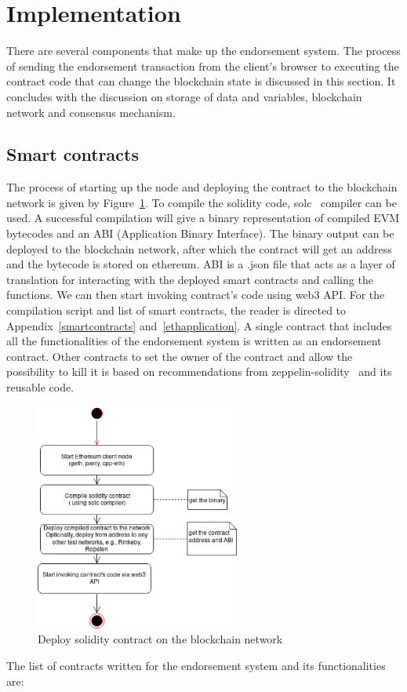 \section{Implementation}
There are several components that make up the endorsement system. The process
of sending the endorsement transaction from the client's browser to executing
the contract code that can change the blockchain state is discussed in this
section. It concludes with the discussion on storage of data and variables,
blockchain network and consensus mechanism.

\subsection{Smart contracts} \label{subsec:smartcontracts}
The process of starting up the node and deploying the contract to the
blockchain network is given by Figure~\ref{fig:startup}. To compile the
solidity code, solc~\cite{} compiler can be used. A successful compilation will
give a binary representation of compiled EVM bytecodes and an ABI (Application
Binary Interface). The binary output can be deployed to the blockchain network,
after which the contract will get an address and the bytecode is stored on
ethereum. ABI is a .json file that acts as a layer of translation for
interacting with the deployed smart contracts and calling the functions. We can
then start invoking contract's code using web3 API. For the compilation script
and list of smart contracts, the reader is directed to
Appendix~\ref{smartcontracts} and~\ref{ethapplication}. A single contract that
includes all the functionalities of the endorsement system is written as an
endorsement contract. Other contracts to set the owner of the contract and
allow the possibility to kill it is based on recommendations from
zeppelin-solidity~\cite{zeppelin-solidity} and its reusable code. \par
\begin{figure}
	\centering
	\includegraphics[width=0.6\textwidth]{Images/DeployContract.eps}
	\caption{Deploy solidity contract on the blockchain network}
	\label{fig:startup}
\end{figure}
The list of contracts written for the endorsement system and its
functionalities are: 

